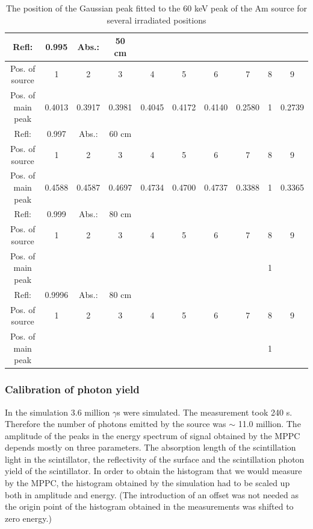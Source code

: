 \documentclass[12pt, a4paper,titlepage]{article}
\numberwithin{equation}{section}
\numberwithin{figure}{section}
\begin{document}

\begin{table}[h!]
\begin{center}
\begin{tabular}{ |c|c|c|c|c|c|c|c|c|c| } 
\hline
Refl:& 0.995 & Abs.:& 50 cm   &  &  &  &  &  &  \\ 
\hline
 Pos. of source & 1 & 2 & 3 & 4 & 5 & 6 & 7 & 8 & 9 \\ 
 Pos. of main peak & 0.4013 & 0.3917 & 0.3981 & 0.4045 & 0.4172 & 0.4140 & 0.2580 & 1 & 0.2739\\ 
 \hline   
\hline
 Refl:& 0.997 & Abs.:& 60 cm   &  &  &  &  &  &  \\ 
 \hline
  Pos. of source & 1 & 2 & 3 & 4 & 5 & 6 & 7 & 8 & 9 \\ 
  Pos. of main peak & 0.4588 & 0.4587 & 0.4697 & 0.4734 & 0.4700 & 0.4737 & 0.3388 & 1 & 0.3365  \\ 
 \hline \hline
Refl:& 0.999 & Abs.:& 80 cm   &  &  &  &  &  &  \\ 
 \hline
  Pos. of source & 1 & 2 & 3 & 4 & 5 & 6 & 7 & 8 & 9 \\ 
  Pos. of main peak &  &  &  &  &  &  &  & 1 &   \\ 
 \hline \hline
Refl:& 0.9996 & Abs.:& 80 cm   &  &  &  &  &  &  \\ 
 \hline
  Pos. of source & 1 & 2 & 3 & 4 & 5 & 6 & 7 & 8 & 9 \\ 
  Pos. of main peak &  &  &  &  &  &  &  & 1 &  \\ 
  \hline
\end{tabular}
 \caption{The position of the Gaussian peak fitted to the 60 keV peak of the Am source for several irradiated positions}
 \label{tabl:simulated}
\end{center}
\end{table}

\subsubsection{Calibration of photon yield}

In the simulation 3.6 million $\gamma$s were simulated. The measurement took 240 s. Therefore the number of photons emitted by the source was $\sim$ 11.0 million. The amplitude of the peaks in the energy spectrum of signal obtained by the MPPC depends mostly on three parameters. The absorption length of the scintillation light in the scintillator, the reflectivity of the surface and the scintillation photon yield of the scintillator. In order to obtain the histogram that we would measure by the MPPC, the histogram obtained by the simulation had to be scaled up both in amplitude and energy. (The introduction of an offset was not needed as the origin point of the histogram obtained in the measurements was shifted to zero energy.)
\end{document}
